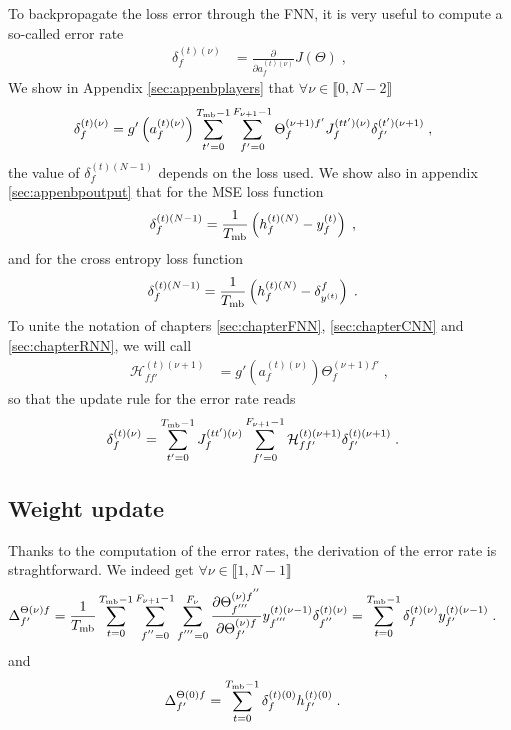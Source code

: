 To backpropagate the loss error through the FNN, it is very useful to compute a so-called error rate
\begin{align}
\delta^{(t)(\nu)}_f&= \frac{\partial }{\partial  a_{f}^{(t)(\nu)}}J(\Theta)\;,
\end{align}
We show in Appendix \ref{sec:appenbplayers} that $\forall \nu \in \llbracket 0,N-2\rrbracket$
\begin{align}
\delta^{(t)(\nu)}_f&=g'\left(a_{f}^{(t)(\nu)}\right)
%
\sum_{t'=0}^{T_{{\rm mb}}-1}\sum_{f'=0}^{F_{\nu+1}-1}\Theta^{(\nu+1)f'}_{f}J^{(tt')(\nu)}_{f} \delta^{(t')(\nu+1)}_{f'}\;,
\end{align}
the value of $\delta^{(t)(N-1)}_f$ depends on the loss used. We show also in appendix \ref{sec:appenbpoutput} that for the MSE loss function
\begin{align}
\delta^{(t)(N-1)}_f&= \frac{1}{T_{{\rm mb}}}\left(h_{f}^{(t)(N)}-y_f^{(t)}\right)\;,
\end{align}
and for the cross entropy loss function
\begin{align}
\delta^{(t)(N-1)}_{f}&= \frac{1}{T_{{\rm mb}}}\left(h_{f}^{(t)(N)}-\delta^f_{y^{(t)}}\right)\;.
\end{align}
To unite the notation of chapters \ref{sec:chapterFNN}, \ref{sec:chapterCNN} and \ref{sec:chapterRNN}, we will call 
\begin{align}
\mathcal{H}^{(t)(\nu+1)}_{ff'}&=g'\left(a_{f}^{(t)(\nu)}\right)\Theta^{(\nu+1)f'}_{f}\;,
\end{align}
so that the update rule for the error rate reads 
\begin{align}
\delta^{(t)(\nu)}_f&=
%
\sum_{t'=0}^{T_{{\rm mb}}-1}J^{(tt')(\nu)}_{f}\sum_{f'=0}^{F_{\nu+1}-1}\mathcal{H}^{(t)(\nu+1)}_{ff'} \delta^{(t)(\nu+1)}_{f'}\;.
\end{align}

\subsection{Weight update}

Thanks to the computation of the error rates, the derivation of the error rate is straghtforward. We indeed get $\forall \nu \in \llbracket 1,N-1\rrbracket$
\begin{align}
\Delta^{\Theta(\nu)f}_{f'}&=\frac{1}{T_{{\rm mb}}}\sum_{t=0}^{T_{{\rm mb}}-1}
%
\sum^{F_{\nu+1}-1}_{f^{''}=0}\sum^{F_\nu}_{f^{'''}=0}\frac{\partial\Theta^{(\nu)f^{''}}_{f^{'''}}
%
}{\partial \Theta^{(\nu)f}_{f'}}y^{(t)(\nu-1)}_{f^{'''}}\delta^{(t)(\nu)}_{f^{''}}
%
=\sum_{t=0}^{T_{{\rm mb}}-1}\delta^{(t)(\nu)}_f y^{(t)(\nu-1)}_{f'}\;.
\end{align}
and 
\begin{align}
\Delta^{\Theta(0)f}_{f'}&=\sum_{t=0}^{T_{{\rm mb}}-1}\delta^{(t)(0)}_f h^{(t)(0)}_{f'}\;.
\end{align}

